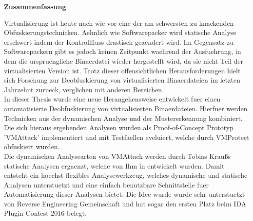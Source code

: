 \documentclass[10pt,twoside,a4paper,bibliography=totoc]{scrbook}
\makeatletter
\newcommand{\echoOther}[1]{Tobias Krau{\ss}}
\def\cleardoublepage{\clearpage\if@twoside \ifodd\c@page\else
  \hbox{}
  \thispagestyle{plain}
  \newpage
  \if@twocolumn\hbox{}\newpage\fi\fi\fi}
\makeatother
\begin{document}
\begin{center}
	\begin{large}
		\textbf{Zusammenfassung}
	\end{large}
\end{center}
\vspace{0.75em}
Virtualisierung ist heute nach wie vor eine der am schwersten zu knackenden Obfuskierungstechnicken. Aehnlich wie Softwarepacker wird statische Analyse erschwert indem der Kontrollfluss drastisch geaendert wird. Im Gegensatz zu Softwarepackern gibt es jedoch keinen Zeitpunkt waehrend der Ausfuehrung, in dem die urspruengliche Binaerdatei wieder hergestellt wird, da sie nicht Teil der virtualisierten Version ist. Trotz dieser offensichtlichen Herausforderungen hielt sich Forschung zur Deobfuskierung von virtualisierten Binaerdateien im letzten Jahrzehnt zurueck, verglichen mit anderen Bereichen.\\
In dieser Thesis wurde eine neue Herangehensweise entwickelt fuer einen automatisierte Deobfuskierung von virtualisierten Binaerdateien. Hierfuer werden Technicken aus der dynamischen Analyse und der Mustererkennung kombiniert. Die sich hieraus ergebenden Analysen wurden als Proof-of-Concept Prototyp 'VMAttack' implementiert und mit Testfaellen eveluiert, welche durch VMProtect obfuskiert wurden.\\
Die dynamischen Analysearten von VMAttack werden durch \echoOther{}s statische Analysen ergaenzt, welche von Ihm in \cite{Krau:Thesis2016} entwickelt wurden. Damit entsteht ein hoechst flexibles Analysewerkzeug, welches dynamische und statische Analysen unterstuetzt und eine einfach benutzbare Schnittstelle fuer Automatisierung dieser Analysen bietet. Die Idee wurde wurde sehr unterstuetzt von Reverse Engineering Gemeinschaft und hat sogar den ersten Platz beim IDA Plugin Contest 2016 belegt.




\begin{onehalfspacing}
\tableofcontents
\end{onehalfspacing}
\cleardoublepage



\fancyhead[RE]{\leftmark}
%
% 
\end{document}
